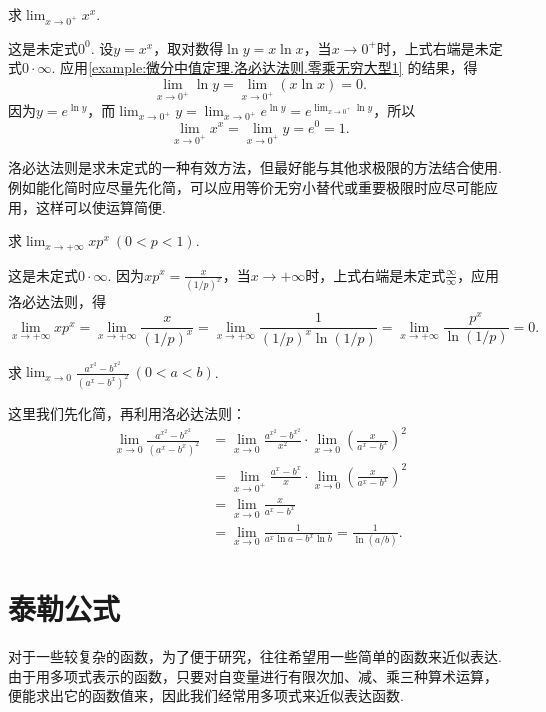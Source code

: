 \begin{example}\label{example:微分中值定理.洛必达法则.零次方零型1}
\def\l{\lim_{x\to0^+}}%
求\(\lim_{x\to0^+}{x^x}\).
\begin{solution}
这是未定式\(0^0\).
设\(y = x^x\)，取对数得\(\ln y = x \ln x\)，当\(x\to0^+\)时，上式右端是未定式\(0\cdot\infty\).
应用\cref{example:微分中值定理.洛必达法则.零乘无穷大型1} 的结果，得\[
\l \ln y = \l (x \ln x) = 0.
\]
因为\(y = e^{\ln y}\)，而\(\l y = \l e^{\ln y} = e^{\l \ln y}\)，所以\[
\l x^x = \l y = e^0 = 1.
\]
\end{solution}
\end{example}

洛必达法则是求未定式的一种有效方法，但最好能与其他求极限的方法结合使用.
例如能化简时应尽量先化简，可以应用等价无穷小替代或重要极限时应尽可能应用，这样可以使运算简便.

\begin{example}\label{example:微分中值定理.洛必达法则.零乘无穷大型2}
\def\l{\lim_{x\to+\infty}}%
求\(\l x p^x\ (0<p<1)\).
\begin{solution}
这是未定式\(0\cdot\infty\).
因为\(x p^x =  \frac{x}{(1/p)^x}\)，当\(x\to+\infty\)时，上式右端是未定式\(\frac{\infty}{\infty}\)，应用洛必达法则，得\[
\l x p^x
= \l \frac{x}{(1/p)^x}
= \l \frac{1}{(1/p)^x \ln(1/p)}
= \l \frac{p^x}{\ln(1/p)}
= 0.
\]
\end{solution}
\end{example}

\begin{example}
\def\l{\lim_{x\to0}}%
求\(\l \frac{a^{x^2}-b^{x^2}}{(a^x-b^x)^2}\ (0<a<b)\).
\begin{solution}
这里我们先化简，再利用洛必达法则：\begin{align*}
\l \frac{a^{x^2}-b^{x^2}}{(a^x-b^x)^2}
&= \l \frac{a^{x^2}-b^{x^2}}{x^2} \cdot \l \left(\frac{x}{a^x-b^x}\right)^2 \\
&= \lim_{x\to0^+} \frac{a^x-b^x}{x} \cdot \l \left(\frac{x}{a^x-b^x}\right)^2 \\
&= \l \frac{x}{a^x-b^x} \\
&= \l \frac{1}{a^x \ln a - b^x \ln b}
= \frac{1}{\ln(a/b)}.
\end{align*}
\end{solution}
\end{example}

\section{泰勒公式}\label{section:微分中值定理.泰勒公式}
对于一些较复杂的函数，为了便于研究，往往希望用一些简单的函数来近似表达.
由于用多项式表示的函数，只要对自变量进行有限次加、减、乘三种算术运算，
便能求出它的函数值来，因此我们经常用多项式来近似表达函数.

